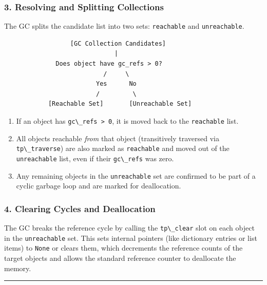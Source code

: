 \hypertarget{resolving-and-splitting-collections}{%
\subsubsection{3. Resolving and Splitting
Collections}\label{resolving-and-splitting-collections}}

The GC splits the candidate list into two sets:
\passthrough{\lstinline!reachable!} and
\passthrough{\lstinline!unreachable!}.

\begin{lstlisting}
                  [GC Collection Candidates]
                              |
              Does object have gc_refs > 0?
                           /     \
                         Yes      No
                         /         \
            [Reachable Set]       [Unreachable Set]
\end{lstlisting}

\begin{enumerate}
\def\labelenumi{\arabic{enumi}.}
\tightlist
\item
  If an object has \passthrough{\lstinline!gc\_refs > 0!}, it is moved
  back to the \passthrough{\lstinline!reachable!} list.
\item
  All objects reachable \emph{from} that object (transitively traversed
  via \passthrough{\lstinline!tp\_traverse!}) are also marked as
  \passthrough{\lstinline!reachable!} and moved out of the
  \passthrough{\lstinline!unreachable!} list, even if their
  \passthrough{\lstinline!gc\_refs!} was zero.
\item
  Any remaining objects in the \passthrough{\lstinline!unreachable!} set
  are confirmed to be part of a cyclic garbage loop and are marked for
  deallocation.
\end{enumerate}

\hypertarget{clearing-cycles-and-deallocation}{%
\subsubsection{4. Clearing Cycles and
Deallocation}\label{clearing-cycles-and-deallocation}}

The GC breaks the reference cycle by calling the
\passthrough{\lstinline!tp\_clear!} slot on each object in the
\passthrough{\lstinline!unreachable!} set. This sets internal pointers
(like dictionary entries or list items) to
\passthrough{\lstinline!None!} or clears them, which decrements the
reference counts of the target objects and allows the standard reference
counter to deallocate the memory.

\begin{center}\rule{0.5\linewidth}{0.5pt}\end{center}
